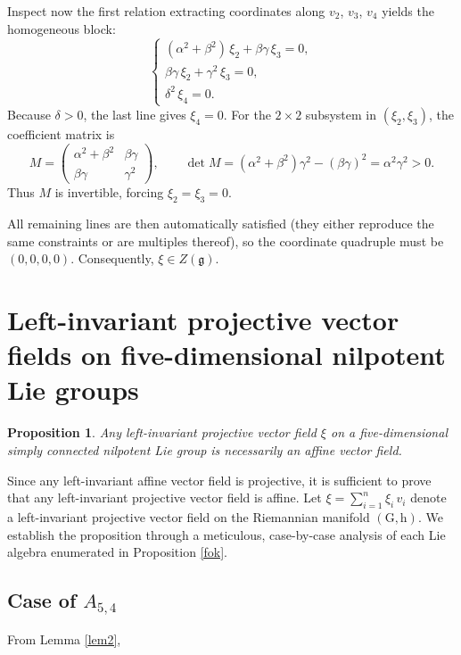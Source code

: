 \documentclass[10pt]{article}
\newtheorem{Proposition}{Proposition}
\begin{document}
Inspect now the first relation extracting coordinates along $v_2$, $v_3$, $v_4$ yields the homogeneous block:
\[
\begin{cases}
(\alpha^2+\beta^2)\,\xi_2 + \beta\gamma\,\xi_3 = 0,\\[2pt]
\beta\gamma\,\xi_2 + \gamma^2\,\xi_3 = 0,\\[2pt]
\delta^2\,\xi_4 = 0.
\end{cases}
\]
Because $\delta>0$, the last line gives $\xi_4=0$. For the $2\times2$ subsystem in $(\xi_2,\xi_3)$, the coefficient matrix is
\[
M=\begin{pmatrix}
\alpha^2+\beta^2 & \beta\gamma\\
\beta\gamma & \gamma^2
\end{pmatrix},
\qquad 
\det M=(\alpha^2+\beta^2)\gamma^2-(\beta\gamma)^2=\alpha^2\gamma^2>0.
\]
Thus $M$ is invertible, forcing $\xi_2=\xi_3=0$.

All remaining lines are then automatically satisfied (they either reproduce the same constraints or are multiples thereof), so the coordinate quadruple must be $(0,0,0,0)$. Consequently, $\xi\in Z(\mathfrak{g}).$


\section{Left-invariant projective vector fields on five-dimensional nilpotent Lie groups}

\begin{Proposition}
Any left-invariant projective vector field \(\xi\) on a five-dimensional simply connected nilpotent Lie group is necessarily an affine vector field.
\end{Proposition}
Since any left-invariant affine vector field is projective, it is sufficient to prove that any left-invariant projective vector field is affine.
Let
\(
\xi = \sum_{i=1}^{n} \xi_{i}\,v_{i}
\)
denote a left-invariant projective vector field on the Riemannian manifold \((\mathrm{G}, \mathrm{h})\). We establish the proposition through a meticulous, case-by-case analysis of each Lie algebra enumerated in Proposition \ref{fok}.
\subsection{Case of $A_{5,4}$}
From Lemma \ref{lem2}, 
\end{document}
